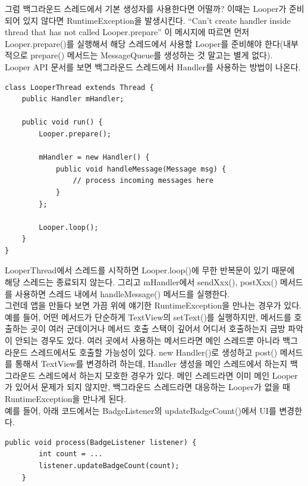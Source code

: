 그럼 백그라운드 스레드에서 기본 생성자를 사용한다면 어떨까? 이때는 Looper가 준비되어 있지 않다면 RuntimeException을 발생시킨다. 
``Can't create handler inside thread that has not called Looper.prepare''
이 메시지에 따르면 먼저 Looper.prepare()를 실행해서 해당 스레드에서 사용할 Looper를 준비해야 한다(내부적으로 prepare() 메서드는 MessageQueue를 생성하는 것 말고는 별게 없다).\\

Looper API 문서를 보면 백그라운드 스레드에서 Handler를 사용하는 방법이 나온다.

\begin{lstlisting}[frame=single, caption=Looper 사용, label=src:LooperThread] 
class LooperThread extends Thread {
	public Handler mHandler;

	public void run() {
		Looper.prepare();

		mHandler = new Handler() {
        	public void handleMessage(Message msg) {
            	// process incoming messages here
			}
		};

		Looper.loop();
	}
}
\end{lstlisting}
LooperThread에서 스레드를 시작하면 Looper.loop()에 무한 반복문이 있기 때문에 해당 스레드는 종료되지 않는다. 
그리고 mHandler에서 sendXxx(), postXxx() 메서드를 사용하면 스레드 내에서 handleMessage() 메서드를 실행한다.\\

그런데 앱을 만들다 보면 가끔 위에 얘기한 RuntimeException을 만나는 경우가 있다.
예를 들어, 어떤 메서드가 단순하게 TextView의 setText()를 실행하지만, 메서드를 호출하는 곳이 여러 군데이거나 메서드 호출 스택이 깊어서 어디서 호출하는지 금방 파악이 안되는 경우도 있다.
여러 곳에서 사용하는 메서드라면 메인 스레드뿐 아니라 백그라운드 스레드에서도 호출할 가능성이 있다. 
new Handler()로 생성하고 post() 메서드를 통해서 TextView를 변경하려 하는데, Handler 생성을 메인 스레드에서 하는지 백그라운드 스레드에서 하는지 모호한 경우가 있다.
메인 스레드라면 이미 메인 Looper가 있어서 문제가 되지 않지만, 백그라운드 스레드라면 대응하는 Looper가 없을 때 RuntimeException을 만나게 된다.\\

예를 들어, 아래 코드에서는 BadgeListener의 updateBadgeCount()에서 UI를 변경한다.
\begin{lstlisting}[frame=single] 
	public void process(BadgeListener listener) {
		int count = ...
		listener.updateBadgeCount(count);
	}
\end{lstlisting}	

